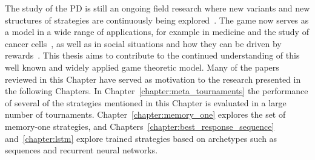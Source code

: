 The study of the PD is still an ongoing field research where new variants and
new structures of strategies are
continuously being explored~\cite{Ohtsuki2018}. The game now serves as a model
in a wide range of applications, for example in medicine and the study of cancer
cells~\cite{archetti2018, Kaznatchee2017}, as well as in social situations and
how they can be driven by rewards~\cite{Dridi2018}.
This thesis aims to contribute to the continued understanding of this well known
and widely applied game theoretic model.
Many of the papers reviewed in this Chapter have served as motivation to the
research presented in the following Chapters. In
Chapter~\ref{chapter:meta_tournaments} the performance of several of the
strategies mentioned in this Chapter is evaluated in a large number of
tournaments. Chapter~\ref{chapter:memory_one} explores the set of memory-one
strategies, and Chapters~\ref{chapter:best_response_sequence} and~\ref{chapter:lstm}
explore trained strategies based on archetypes such as sequences and recurrent
neural networks.
